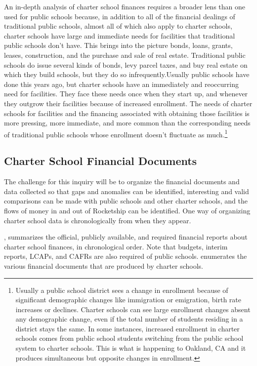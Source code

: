 An in-depth analysis of charter school finances requires a broader lens than one used for public schools because, in addition to all of the financial dealings of traditional public schools, almost all of which also apply to charter schools, charter schools have large and immediate needs for facilities that traditional public schools don’t have. This brings into the picture bonds, loans, grants, leases, construction, and the purchase and sale of real estate. Traditional public schools do issue several kinds of bonds, levy parcel taxes, and buy real estate on which they build schools, but they do so infrequently.Usually public schools have done this years ago, but charter schools have an immediately and reoccurring need for facilities. They face these needs once when they start up, and whenever they outgrow their facilities because of increased enrollment. The needs of charter schools for facilities and the financing associated with obtaining those facilities is more pressing, more immediate, and more common than the corresponding needs of traditional public schools whose enrollment doesn't fluctuate as much.\footnote{Usually a public school district sees a change in enrollment because of significant demographic changes like immigration or emigration, birth rate increases or declines. Charter schools can see large enrollment changes absent any demographic change, even if the total number of students residing in a district stays the same. In some instances, increased enrollment in charter schools comes from public school students switching from the public school system to charter schools. This is what is happening to Oakland, CA and it produces simultaneous but opposite changes in enrollment.}

\subsection{Charter School Financial Documents}\label{sec:charter-financial-docs}\indent

The challenge for this inquiry will be to organize the financial documents and data collected so that gaps and anomalies can be identified, interesting and valid comparisons can be made with public schools and other charter schools, and the flows of money in and out of Rocketship can be identified. One way of organizing charter school data is chronologically from when they appear.

, summarizes the official, publicly available, and required financial reports about charter school finances, in chronological order. Note that budgets, interim reports, LCAPs, and CAFRs are also required of public schools.  enumerates the various financial documents that are produced by charter schools. 

